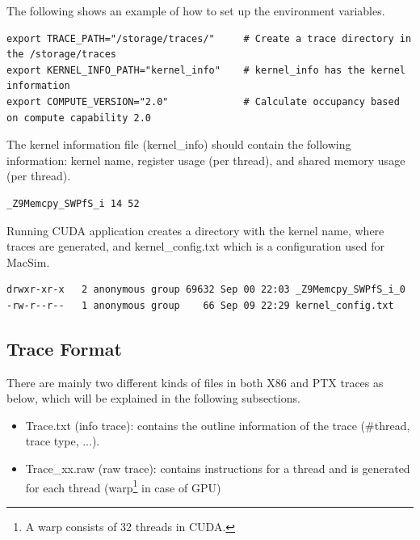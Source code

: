 The following shows an example of how to set up the environment variables.

\smallskip
\begin{lstlisting}
export TRACE_PATH="/storage/traces/"     # Create a trace directory in the /storage/traces
export KERNEL_INFO_PATH="kernel_info"    # kernel_info has the kernel information
export COMPUTE_VERSION="2.0"             # Calculate occupancy based on compute capability 2.0
\end{lstlisting}
\smallskip

The kernel information file (kernel\_info) should contain the following
information: kernel name, register usage (per thread), and shared memory usage
(per thread).

\smallskip
\begin{lstlisting}
_Z9Memcpy_SWPfS_i 14 52 
\end{lstlisting}
\smallskip

Running CUDA application creates a directory with the kernel name, where traces 
are generated, and kernel\_config.txt which is a configuration used for MacSim.

\smallskip
\begin{lstlisting}
drwxr-xr-x   2 anonymous group 69632 Sep 00 22:03 _Z9Memcpy_SWPfS_i_0
-rw-r--r--   1 anonymous group    66 Sep 09 22:29 kernel_config.txt
\end{lstlisting}
\smallskip


\subsection{Trace Format}
\label{sec:traceformat}

There are mainly two different kinds of files in both X86 and PTX traces as
below, which will be explained in the following subsections.

\begin{itemize}\itemsep2pt
\item Trace.txt (info trace): contains the outline information of the trace (\#thread, trace type, ...).
\item Trace\_xx.raw (raw trace): contains instructions for a thread and is generated for each thread (warp\footnote{A warp consists of 32 threads in CUDA.} in case of GPU)
\end{itemize}

